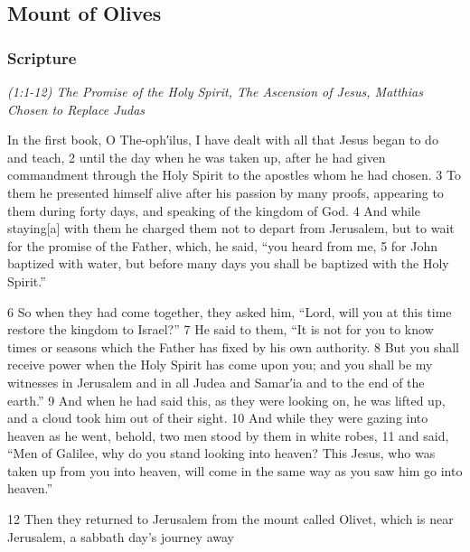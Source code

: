 \documentclass[letterpaper]{report}
\begin{document}
\clearpage
\subsection{Mount of Olives}
\begin{multicols}{2}
	\mbox{}
\end{multicols}
\subsubsection{Scripture}

{\centering
	\emph{(1:1-12) The Promise of the Holy Spirit, The Ascension of Jesus, Matthias Chosen to Replace Judas}\\
}
\begin{multicols}{2}

In the first book, O The-oph′ilus, I have dealt with all that Jesus began to do and teach, 2 until the day when he was taken up, after he had given commandment through the Holy Spirit to the apostles whom he had chosen. 3 To them he presented himself alive after his passion by many proofs, appearing to them during forty days, and speaking of the kingdom of God. 4 And while staying[a] with them he charged them not to depart from Jerusalem, but to wait for the promise of the Father, which, he said, “you heard from me, 5 for John baptized with water, but before many days you shall be baptized with the Holy Spirit.”

6 So when they had come together, they asked him, “Lord, will you at this time restore the kingdom to Israel?” 7 He said to them, “It is not for you to know times or seasons which the Father has fixed by his own authority. 8 But you shall receive power when the Holy Spirit has come upon you; and you shall be my witnesses in Jerusalem and in all Judea and Samar′ia and to the end of the earth.” 9 And when he had said this, as they were looking on, he was lifted up, and a cloud took him out of their sight. 10 And while they were gazing into heaven as he went, behold, two men stood by them in white robes, 11 and said, “Men of Galilee, why do you stand looking into heaven? This Jesus, who was taken up from you into heaven, will come in the same way as you saw him go into heaven.”

12 Then they returned to Jerusalem from the mount called Olivet, which is near Jerusalem, a sabbath day’s journey away
\end{multicols}
\end{document}
